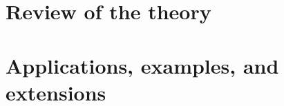 %



\cleardoublepage
\part{Review of the theory}
\cleardoublepage


\part{Applications, examples, and extensions}
\cleardoublepage



%


